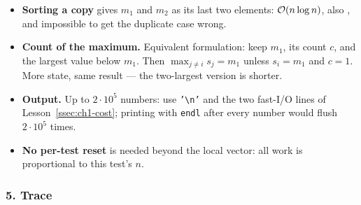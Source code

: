 \begin{tricksbox}
\begin{itemize}[leftmargin=*]
    \item \textbf{Sorting a copy} gives $m_1$ and $m_2$ as its last two elements: $\mathcal{O}(n \log n)$, also \ac{}, and impossible to get the duplicate case wrong.
    \item \textbf{Count of the maximum.} Equivalent formulation: keep $m_1$, its count $c$, and the largest value below $m_1$. Then $\max_{j\ne i} s_j = m_1$ unless $s_i = m_1$ and $c = 1$. More state, same result --- the two-largest version is shorter.
    \item \textbf{Output.} Up to $2\cdot10^5$ numbers: use \texttt{'\textbackslash n'} and the two fast-I/O lines of Lesson~\ref{ssec:ch1-cost}; printing with \texttt{endl} after every number would flush $2\cdot10^5$ times.
    \item \textbf{No per-test reset} is needed beyond the local vector: all work is proportional to this test's $n$.
\end{itemize}
\end{tricksbox}

\subsubsection*{5. Trace}

